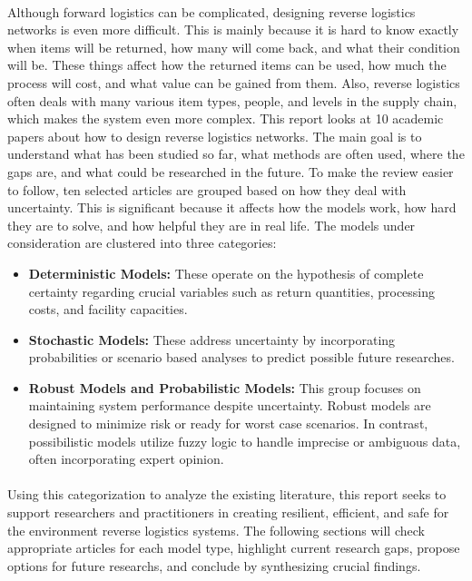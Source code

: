 \paragraph{} Although forward logistics can be complicated, designing reverse logistics networks is even more difficult. This is mainly because it is hard to know exactly when items will be returned, how many will come back, and what their condition will be. These things affect how the returned items can be used, how much the process will cost, and what value can be gained from them. Also, reverse logistics often deals with many various item types, people, and levels in the supply chain, which makes the system even more complex.
This report looks at 10 academic papers about how to design reverse logistics networks. The main goal is to understand what has been studied so far, what methods are often used, where the gaps are, and what could be researched in the future. To make the review easier to follow, ten selected articles are grouped based on how they deal with uncertainty. This is significant because it affects how the models work, how hard they are to solve, and how helpful they are in real life.
The models under consideration are clustered into three categories:
\begin{itemize}[label=, leftmargin=2mm]
    \item \textbf{Deterministic Models:} These operate on the hypothesis of complete certainty regarding crucial variables such as return quantities, processing costs, and facility capacities.

    \item \textbf{Stochastic Models:} These address uncertainty by incorporating probabilities or scenario based analyses to predict possible future researches.
    \item \textbf{Robust Models and Probabilistic Models:} This group focuses on maintaining system performance despite uncertainty. Robust models are designed to minimize risk or ready for worst case scenarios. In contrast, possibilistic models utilize fuzzy logic to handle imprecise or ambiguous data, often incorporating expert opinion.
\end{itemize}

\paragraph{} Using this categorization to analyze the existing literature, this report seeks to support researchers and practitioners in creating resilient, efficient, and safe for the environment reverse logistics systems. The following sections will check appropriate articles for each model type, highlight current research gaps, propose options for future researchs, and conclude by synthesizing crucial findings.
